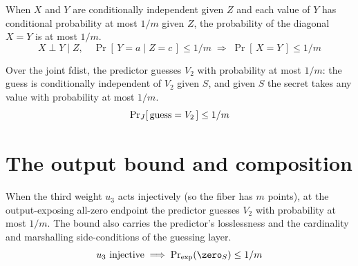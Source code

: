 \begin{lemma}
  \label{lem:cinde_diagonal_bound}
  \rocqok
  When $X$ and $Y$ are conditionally independent given $Z$ and each value of $Y$
  has conditional probability at most $1/m$ given $Z$, the probability of the
  diagonal $X = Y$ is at most $1/m$.
  \[ X \perp Y \mid Z,\quad \Pr[\,Y = a \mid Z = c\,] \le 1/m
        \;\Longrightarrow\; \Pr[\,X = Y\,] \le 1/m \]
\end{lemma}

\begin{lemma}
  \label{lem:guess_fdist_success_le}
  \rocqok
  Over the joint fdist, the predictor guesses $V_2$ with probability at most
  $1/m$: the guess is conditionally independent of $V_2$ given $S$, and given $S$
  the secret takes any value with probability at most $1/m$.
  \[ \Pr\nolimits_{J}[\,\mathrm{guess}=V_2\,] \le 1/m \]
\end{lemma}

\section{The output bound and composition}

\begin{theorem}
  \label{thm:guess_sdistr_success_le}
  \rocqok
  When the third weight $u_3$ acts injectively (so the fiber has $m$ points), at
  the output-exposing all-zero endpoint the predictor guesses $V_2$ with
  probability at most $1/m$. The bound also carries the predictor's losslessness
  and the cardinality and marshalling side-conditions of the guessing layer.
  \[ u_3 \text{ injective} \;\Longrightarrow\; \Prexp(\zero_S) \le 1/m \]
\end{theorem}

